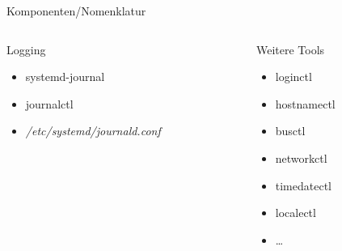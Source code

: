 \begin{frame}[allowframebreaks]{Komponenten/Nomenklatur}
  \framebreak

  \begin{columns}[onlytextwidth]
    \begin{column}[t]{0.5\textwidth}
      \begin{block}{Logging}
        \begin{itemize}
          \item systemd-journal
          \item journalctl
	  \item \emph{/etc/systemd/journald.conf}
	\end{itemize}
      \end{block}
    \end{column}

    \begin{column}[t]{0.5\textwidth}
      \begin{block}{Weitere Tools}
      \begin{itemize}
        \item loginctl
	\item hostnamectl
	\item busctl
	\item networkctl
	\item timedatectl
	\item localectl
	\item \dots
      \end{itemize}
      \end{block}
    \end{column}
  \end{columns}
\end{frame}

